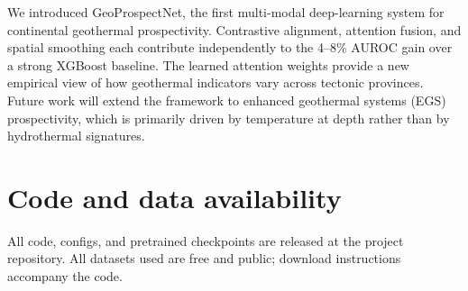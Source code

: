 \documentclass[review,12pt]{elsarticle}
\begin{document}
We introduced GeoProspectNet, the first multi-modal deep-learning system for continental geothermal prospectivity. Contrastive alignment, attention fusion, and spatial smoothing each contribute independently to the 4–8\% AUROC gain over a strong XGBoost baseline. The learned attention weights provide a new empirical view of how geothermal indicators vary across tectonic provinces. Future work will extend the framework to enhanced geothermal systems (EGS) prospectivity, which is primarily driven by temperature at depth rather than by hydrothermal signatures.

\section*{Code and data availability}
All code, configs, and pretrained checkpoints are released at the project repository. All datasets used are free and public; download instructions accompany the code.


\end{document}
